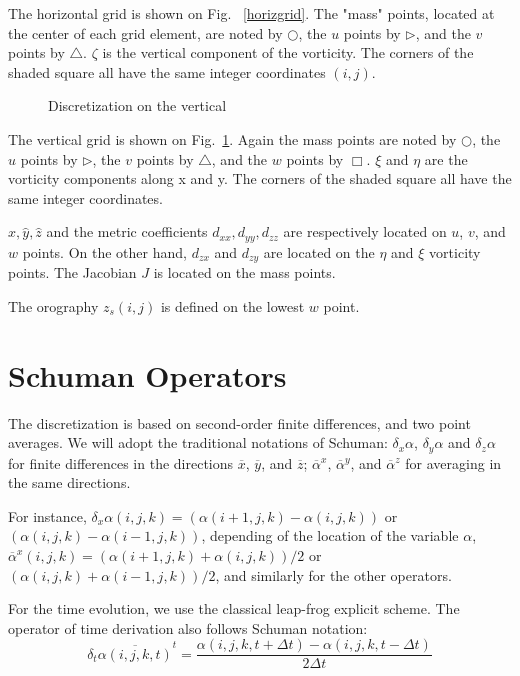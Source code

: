 The horizontal grid is shown on Fig. ~\ref{horizgrid}.
The "mass" points, located at the center of each grid element, are noted
by $\bigcirc$, the $u$ points by $\triangleright$, and the $v$ points
by  $\bigtriangleup$.
$\zeta $ is the vertical component of the vorticity.
The corners of the shaded square all have the same integer coordinates
$(i,j)$.

\begin{figure}[pbh]
\vspace{1cm}
\caption{Discretization on the vertical \label{vertgrid}}
\end{figure}

The vertical grid is shown on Fig.~\ref{vertgrid}.
Again the mass points are noted by
$\bigcirc$, the $u$ points by $\triangleright$, the $v$ points
by $\bigtriangleup$,
and the $w$ points by $\Box$. $\xi$ and $\eta$ are the vorticity components
along x and y. The corners of the shaded square all
have the same integer coordinates.

$\widehat{x},\widehat{y},\widehat{z}$
and the metric coefficients $d_{xx},d_{yy},d_{zz}$ are
respectively located on $u$, $v$, and $w$ points. On the other hand,
$d_{zx}$ and $d_{zy}$ are located on the $\eta$ and $\xi$ vorticity points.
The Jacobian $J$ is located on the mass points.

The orography $z_{s}(i,j)$ is defined on the lowest $w$ point.

\section{Schuman Operators}
The discretization is based on second-order finite differences, and two point
averages. We will adopt the traditional notations of Schuman:
$\delta_{x}\alpha$, $\delta_{y}\alpha$ and $\delta_{z}\alpha$ for finite
differences in the directions $\overline{x}$,  $\overline{y}$, and
$\overline{z}$;  $\overline{\alpha}^{x}$, $\overline{\alpha}^{y}$, and
$\overline{\alpha}^{z}$ for averaging in the same directions.

For instance, $\delta_x\alpha (i,j,k)= (\alpha(i+1,j,k)-\alpha(i,j,k))$
or $(\alpha(i,j,k) -\alpha(i-1,j,k))$, depending of the location of
the variable $\alpha$, $\overline{\alpha}^{x}(i,j,k)=(\alpha(i+1,j,k)+
\alpha(i,j,k))/2$ or $(\alpha(i,j,k)+\alpha(i-1,j,k))/2$, and
similarly for the other operators.

For the time evolution,
we use the classical leap-frog explicit scheme. The operator of time
derivation also follows Schuman notation:
\begin{equation}
\delta _{t}\overline{ \alpha (i,j,k,t)}^{t} =
\dfrac{\alpha (i,j,k,t+\Delta t)-\alpha (i,j,k,t-\Delta t)}{2 \Delta t}
\end{equation}

